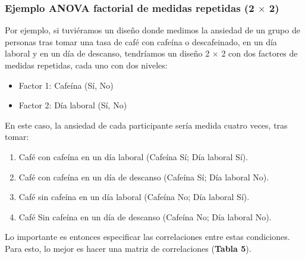 \documentclass[
]{article}
\providecommand{\tightlist}{%
  \setlength{\itemsep}{0pt}\setlength{\parskip}{0pt}}
\begin{document}
\hypertarget{ejemplo-anova-factorial-de-medidas-repetidas-2-times-2}{%
\subsubsection{\texorpdfstring{Ejemplo ANOVA factorial de medidas
repetidas (2 \(\times\)
2)}{Ejemplo ANOVA factorial de medidas repetidas (2 \textbackslash times 2)}}\label{ejemplo-anova-factorial-de-medidas-repetidas-2-times-2}}

Por ejemplo, si tuviéramos un diseño donde medimos la ansiedad de un
grupo de personas tras tomar una tasa de café con cafeína o
descafeinado, en un día laboral y en un día de descanso, tendríamos un
diseño 2 \(\times\) 2 con dos factores de medidas repetidas, cada uno
con dos niveles:

\begin{itemize}
\tightlist
\item
  Factor 1: Cafeína (Sí, No)
\item
  Factor 2: Día laboral (Sí, No)
\end{itemize}

En este caso, la ansiedad de cada participante sería medida cuatro
veces, tras tomar:

\begin{enumerate}
\def\labelenumi{\arabic{enumi}.}
\tightlist
\item
  Café con cafeína en un día laboral (Cafeína Sí; Día laboral Sí).
\item
  Café con cafeína en un día de descanso (Cafeína Sí; Día laboral No).
\item
  Café sin cafeína en un día laboral (Cafeína No; Día laboral Sí).
\item
  Café Sin cafeína en un día de descanso (Cafeína No; Día laboral No).
\end{enumerate}

Lo importante es entonces especificar las correlaciones entre estas
condiciones. Para esto, lo mejor es hacer una matriz de correlaciones
(\textbf{Tabla 5}).
\end{document}
